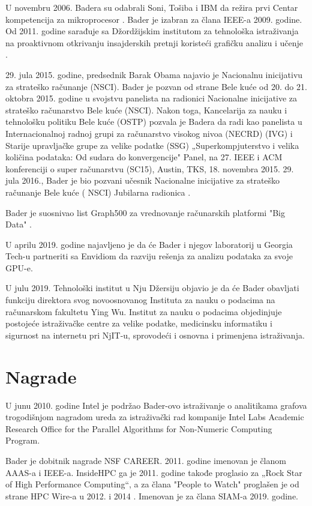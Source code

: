 \documentclass[a4paper]{article}
\begin{document}
{U novembru 2006. Badera su odabrali Soni, Tošiba i IBM da režira prvi Centar kompetencija za mikroprocesor \cite{mik} \cite{mikr}. Bader je izabran za člana IEEE-a 2009. godine. Od 2011. godine sarađuje sa Džordžijskim institutom za tehnološka istraživanja na proaktivnom otkrivanju insajderskih pretnji koristeći grafičku analizu i učenje \cite{uce}.

29. jula 2015. godine, predsednik Barak Obama najavio je Nacionalnu inicijativu za strateško računanje (NSCI). Bader je pozvan od strane Bele kuće od 20. do 21. oktobra 2015. godine u svojstvu panelista na radionici Nacionalne inicijative za strateško računarstvo Bele kuće (NSCI). Nakon toga, Kancelarija za nauku i tehnološku politiku Bele kuće (OSTP) pozvala je Badera da radi kao panelista u Internacionalnoj radnoj grupi za računarstvo visokog nivoa (NECRD) (IVG) i Starije upravljačke grupe za velike podatke (SSG) „Superkompjuterstvo i velika količina podataka: Od sudara do konvergencije" Panel, na 27. IEEE i ACM konferenciji o super računarstvu (SC15), Austin, TKS, 18. novembra 2015. 29. jula 2016., Bader je bio pozvani učesnik Nacionalne inicijative za strateško računanje Bele kuće ( NSCI) Jubilarna radionica \cite{radi}.

Bader je suosnivao list Graph500 za vrednovanje računarskih platformi "Big Data" \cite{data}.

U aprilu 2019. godine najavljeno je da će Bader i njegov laboratorij u Georgia Tech-u partneriti sa Envidiom da razviju rešenja za analizu podataka za svoje GPU-e.

U julu 2019. Tehnološki institut u Nju Džersiju objavio je da će Bader obavljati funkciju direktora svog novoosnovanog Instituta za nauku o podacima na računarskom fakultetu Ying Wu. Institut za nauku o podacima objedinjuje postojeće istraživačke centre za velike podatke, medicinsku informatiku i sigurnost na internetu pri NjIT-u, sprovodeći i osnovna i primenjena istraživanja.

\section{Nagrade}
U junu 2010. godine Intel je podržao Bader-ovo istraživanje o analitikama grafova trogodišnjom nagradom ureda za istraživački rad kompanije Intel Labs Academic Research Office for the Parallel Algorithms for Non-Numeric Computing Program.

Bader je dobitnik nagrade NSF CAREER. 2011. godine imenovan je članom AAAS-a i IEEE-a. InsideHPC ga je 2011. godine takođe proglasio za „Rock Star of High Performance Computing“, a za člana "People to Watch" proglašen je od strane HPC Wire-a u 2012. i 2014 \cite{wire} \cite{hwire}. Imenovan je za člana SIAM-a 2019. godine.

}
\end{document}
